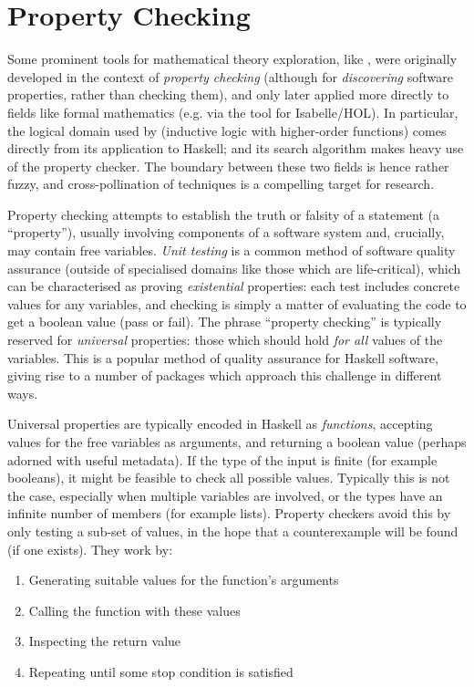 \section{Property Checking}

Some prominent tools for mathematical theory exploration, like \qspec{}, were
originally developed in the context of \emph{property checking} (although for
\emph{discovering} software properties, rather than checking them), and only
later applied more directly to fields like formal mathematics (e.g. via the
\hipster{} tool for Isabelle/HOL). In particular, the logical domain used by
\qspec{} (inductive logic with higher-order functions) comes directly from its
application to Haskell; and its search algorithm makes heavy use of the
\qcheck{} property checker. The boundary between these two fields is hence
rather fuzzy, and cross-pollination of techniques is a compelling target for
research.

Property checking attempts to establish the truth or falsity of a statement (a
``property''), usually involving components of a software system and, crucially,
may contain free variables. \emph{Unit testing} is a common method of software
quality assurance (outside of specialised domains like those which are
life-critical), which can be characterised as proving \emph{existential}
properties: each test includes concrete values for any variables, and checking
is simply a matter of evaluating the code to get a boolean value (pass or fail).
The phrase ``property checking'' is typically reserved for \emph{universal}
properties: those which should hold \emph{for all} values of the variables.
This is a popular method of quality assurance for Haskell software, giving rise
to a number of packages which approach this challenge in different ways.

Universal properties are typically encoded in Haskell as \emph{functions},
accepting values for the free variables as arguments, and returning a boolean
value (perhaps adorned with useful metadata). If the type of the input is finite
(for example booleans), it might be feasible to check all possible
values. Typically this is not the case, especially when multiple variables are
involved, or the types have an infinite number of members (for example
lists). Property checkers avoid this by only testing a sub-set of values, in the
hope that a counterexample will be found (if one exists). They work by:

\begin{enumerate}
\item Generating suitable values for the function's arguments
\item Calling the function with these values
\item Inspecting the return value
\item Repeating until some stop condition is satisfied
\end{enumerate}

